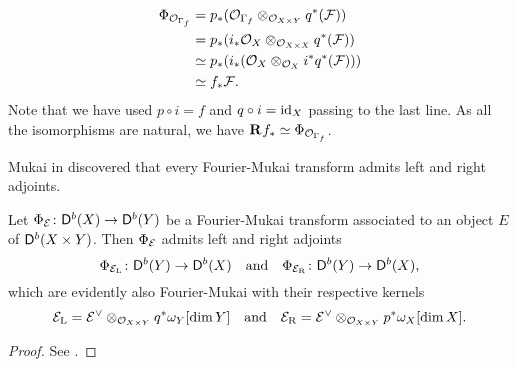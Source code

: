 \begin{example}
\begin{enumerate}[label = (\roman*)]
{\begin{align*}
        \Phi_{{\mathcal{O}_{\Gamma_f}}} &= p_*({\mathcal{O}_{\Gamma_f}} \otimes_{{\mathcal{O}_{X \times Y}}} q^*(\mathcal F)) \\
        &= p_*(i_*{\mathcal{O}_{X}} \otimes_{{\mathcal{O}_{X \times X}}} q^*(\mathcal F)) \\
        &\simeq p_*(i_*({\mathcal{O}_{X}} \otimes_{{\mathcal{O}_{X}}} i^*q^*(\mathcal F))) \\
        &\simeq f_*\mathcal F.
    \end{align*}
    Note that we have used $p \circ i = f$ and $q \circ i = \operatorname{id}_{X}$ passing to the last line. As all the isomorphisms are natural, we have $\mathbf{R}^{}f_* \simeq \Phi_{{\mathcal{O}_{\Gamma_f}}}$.
    }
\end{enumerate}
\end{example}

Mukai in \cite[text]{keylist} discovered that every Fourier-Mukai transform admits left and right adjoints. 

\begin{proposition}[Mukai]
    \label{Adjoints of FM transforms}
    Let $\Phi_{\mathcal E} \colon \mathsf{D}^b(X) \to \mathsf{D}^b(Y)$ be a Fourier-Mukai transform associated to an object $E$ of $\mathsf{D}^b(X \times Y)$. Then $\Phi_{\mathcal E}$ admits left and right adjoints
    \[
        \Phi_{\mathcal E_\mathrm{L}} \colon \mathsf{D}^b(Y) \to \mathsf{D}^b(X) \quad \text{and} \quad \Phi_{\mathcal E_\mathrm{R}} \colon \mathsf{D}^b(Y) \to \mathsf{D}^b(X),
    \]
    which are evidently also Fourier-Mukai with their respective kernels
    \[
        \mathcal E_\mathrm{L} = \mathcal E^\vee \otimes_{{\mathcal{O}_{X \times Y}}} q^*\omega_Y[\dim Y] \quad \text{and} \quad 
        \mathcal E_\mathrm{R} = \mathcal E^\vee \otimes_{{\mathcal{O}_{X \times Y}}} p^*\omega_X[\dim X].
    \]
\end{proposition}

\begin{proof}
    See \cite[\S 5, Proposition 5.9]{huybrechts2006fouriermukai}.
\end{proof}

